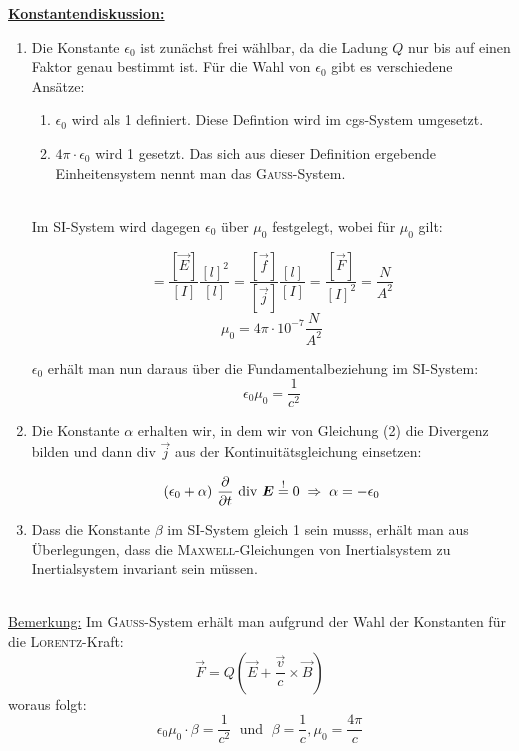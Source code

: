 \underline{\textbf{Konstantendiskussion:}}
\ \\
\begin{enumerate}
\item Die Konstante $\epsilon_0$ ist zunächst frei wählbar, da die Ladung $Q$ nur bis auf einen Faktor genau bestimmt ist. Für die Wahl von $\epsilon_0$ gibt es verschiedene Ansätze:\
\begin{enumerate}
\item $\epsilon_0$ wird als 1 definiert. Diese Defintion wird im cgs-System umgesetzt.\
\\
\item $4\pi\cdot\epsilon_0$ wird 1 gesetzt. Das sich aus dieser Definition ergebende Einheitensystem nennt man das \textsc{Gauss}-System.\
\end{enumerate}
\ \\
Im SI-System wird dagegen $\epsilon_0$ über $\mu_0$ festgelegt, wobei für $\mu_0$ gilt:

\begin{equation*}
[\mu_0] = \frac{[\vec{E}]}{[I]}\frac{[l]^2}{[l]}=\frac{[\vec{f}]}{[\vec{j}]}\frac{[l]}{[I]}=\frac{[\vec{F}]}{[I]^2}=\frac{N}{A^2}
\end{equation*}
\begin{equation*}
\mu_0 = 4\pi\cdot 10^{-7} \frac{N}{A^2}
\end{equation*}

$\epsilon_0$ erhält man nun daraus über die Fundamentalbeziehung im SI-System:
\begin{equation*}
\epsilon_0\mu_0 = \frac{1}{c^2}
\end{equation*}

\item
Die Konstante $\alpha$ erhalten wir, in dem wir von Gleichung (2) die Divergenz bilden und dann div $\vec{j}$ aus der Kontinuitätsgleichung einsetzen:

\begin{equation*}
(\epsilon_0 + \alpha) \ \pdiff{}{t} \ \div \vec{E} \overset{!}{=} 0 \; \Rightarrow \; \alpha = -\epsilon_0 
\end{equation*}

\item
Dass die Konstante $\beta$ im SI-System gleich 1 sein musss, erhält man aus Überlegungen, dass die \textsc{Maxwell}-Gleichungen von Inertialsystem zu Inertialsystem invariant sein müssen.
\end{enumerate}
\ \\
\underline{Bemerkung:}
Im \textsc{Gauss}-System erhält man aufgrund der Wahl der Konstanten für die \textsc{Lorentz}-Kraft:
\begin{equation*}
\vec{F} = Q (\vec{E} + \frac{\vec{v}}{c}\times\vec{B})
\end{equation*}
woraus folgt:
\begin{equation*}
\epsilon_0\mu_0\cdot\beta = \frac{1}{c^2} \; \text{ und } \; \beta = \frac{1}{c}, \mu_0 = \frac{4\pi}{c}
\end{equation*}

